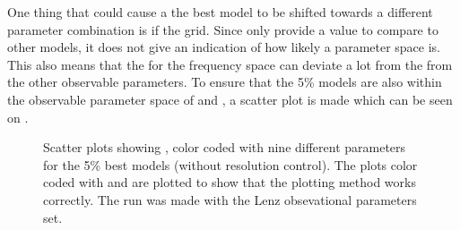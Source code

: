 
One thing that could cause a the best model to be shifted towards a different
parameter combination is if the grid. Since \chis only provide a value to
compare to other models, it does not give an indication of how likely a
parameter space is. This also means that the \chis for the frequency space can
deviate a lot from the \chis from the other observable parameters. To ensure
that the 5\% models are also within the observable parameter space of \logg and
\teff, a scatter plot is made which can be seen on . 

\begin{figure}[htbp]
	\centering
	\caption{Scatter plots showing \teff, \logg color coded with nine different parameters for the 5\% best models (without resolution control). The plots color coded with \teff and \logg are plotted to show that the plotting method works correctly. The run was made with the Lenz obsevational parameters set. }
	\label{scatter}
\end{figure}


